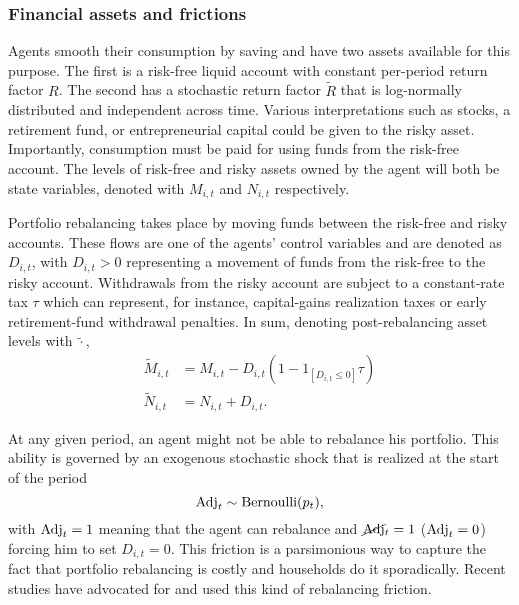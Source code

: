 \documentclass[./RiskyContrib.tex]{subfiles}
\begin{document}
\subsubsection{Financial assets and frictions}\label{sec:fin_frictions}

Agents smooth their consumption by saving and have two assets
available for this purpose. The first is a risk-free liquid account with 
constant per-period return factor $R$. The second has a stochastic return
factor $\tilde{R}$ that is log-normally distributed and independent across
time. Various interpretations such as stocks, a retirement fund, or entrepreneurial
capital could be given to the risky asset. Importantly, consumption must be paid for
using funds from the risk-free account. The levels of risk-free and risky assets
owned by the agent will both be state variables, denoted with $M_{i,t}$ and $N_{i,t}$
respectively.

Portfolio rebalancing takes place by moving funds between the risk-free
and risky accounts. These flows are one of the agents' control variables
and are denoted as $D_{i,t}$, with $D_{i,t}>0$ representing a movement of
funds from the risk-free to the risky account. Withdrawals from the risky
account are subject to a constant-rate tax $\tau$ which can represent, for
instance, capital-gains realization taxes or early retirement-fund withdrawal
penalties. In sum, denoting post-rebalancing asset levels with $\tilde{\cdot}$,
\begin{equation*}
\begin{split}
\tilde{M}_{i,t} &= M_{i,t} - D_{i,t}(1 - 1_{[D_{i,t}\leq0]}\tau)\\
\tilde{N}_{i,t} &= N_{i,t} + D_{i,t}.
\end{split}
\end{equation*}

At any given period, an agent might not be able to rebalance his portfolio.
This ability is governed by an exogenous stochastic shock that is realized
at the start of the period
\begin{equation*}
\text{Adj}_t \sim \text{Bernoulli}(p_t),
\end{equation*}
with $\text{Adj}_t=1$ meaning that the agent can rebalance and $\cancel{\text{Adj}}_t=1$ ($\text{Adj}_t = 0$)
forcing him to set $D_{i,t} = 0$. This friction is a parsimonious way to capture
the fact that portfolio rebalancing is costly and households do it sporadically.
Recent studies have advocated for \citep{Giglio2021aer} and used
\citep{Luetticke2021aej_macro} this kind of rebalancing friction.
\end{document}
